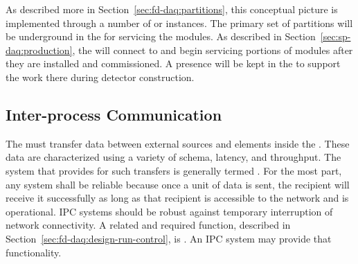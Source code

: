 
As described more in Section~\ref{sec:fd-daq:partitions}, this conceptual picture is implemented through a number of  or instances. 
The primary set of partitions will be underground in the  for servicing the  modules. 
As described in Section~\ref{sec:sp-daq:production}, the  will connect to and begin servicing portions of  modules after they are installed and commissioned. 
A  presence will be kept in the  to support the work there during detector construction.




  



\subsection{Inter-process Communication}
\label{sec:fd-daq:design-messages}

The  must transfer data between external sources and elements inside the . 
These data are characterized using a variety of schema, latency, and throughput. 
The system that provides for such transfers is generally termed .
For the most part, any  system shall  be reliable because once a unit of data is sent, the recipient will receive it successfully as long as that recipient is accessible to the network and is operational. 
IPC systems should be robust against temporary interruption of network connectivity. 
A related and required function, described in Section~\ref{sec:fd-daq:design-run-control}, is . 
An IPC system may  provide that functionality.

